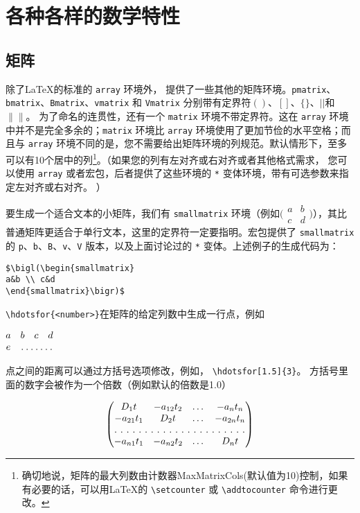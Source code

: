 \VerbatimFootnotes
\chapter{各种各样的数学特性}
\section{矩阵}
除了\LaTeX 的标准的 \verb|array| 环境外，  提供了一些其他的矩阵环境。\verb|pmatrix|、\verb|bmatrix|、\verb|Bmatrix|、\verb|vmatrix| 和 \verb|Vmatrix| 分别带有定界符$()$、$[]$、$\{\}$、$||$和$\|\|$。 为了命名的连贯性，还有一个 \verb|matrix| 环境不带定界符。这在 \verb|array| 环境中并不是完全多余的；\verb|matrix| 环境比 \verb|array| 环境使用了更加节俭的水平空格；而且与 \verb|array| 环境不同的是，您不需要给出矩阵环境的列规范。默认情形下，至多可以有10个居中的列\footnote{确切地说，矩阵的最大列数由计数器{\ttfamily MaxMatrixCols}(默认值为10)控制，如果有必要的话，可以用\LaTeX 的 \verb|\setcounter| 或 \verb|\addtocounter| 命令进行更改。}。（如果您的列有左对齐或右对齐或者其他格式需求，  您可以使用 \verb|array| 或者宏包，后者提供了这些环境的 \verb|*| 变体环境，带有可选参数来指定左对齐或右对齐。 ）

要生成一个适合文本的小矩阵，我们有 \verb|smallmatrix| 环境（例如$\bigl(\begin{smallmatrix}
a&b\\ c&d
\end{smallmatrix}\bigr)$），其比普通矩阵更适合于单行文本，这里的定界符一定要指明。宏包提供了 \verb|smallmatrix| 的 \verb|p|、\verb|b|、\verb|B|、\verb|v|、\verb|V| 版本，以及上面讨论过的 \verb|*| 变体。上述例子的生成代码为：
\begin{verbatim}
$\bigl(\begin{smallmatrix}
a&b \\ c&d
\end{smallmatrix}\bigr)$
\end{verbatim}

\verb|\hdotsfor{<number>}|在矩阵的给定列数中生成一行点，例如
\begin{listing}
$\begin{matrix}
    a&b&c&d\\
    e&\hdotsfor{3}
\end{matrix}$
\end{listing}

点之间的距离可以通过方括号选项修改，例如，  \verb|\hdotsfor[1.5]{3}|。 方括号里面的数字会被作为一个倍数（例如默认的倍数是1.0）
\begin{listing}
\begin{equation}
\begin{pmatrix}
D_1t&-a_{12}t_2&\dots&-a_{n}t_n\\
-a_{21}t_1&D_2t&\dots&-a_{2n}t_n\\
\hdotsfor[2]{4}\\
-a_{n1}t_1&-a_{n2}t_2&\dots&D_nt
\end{pmatrix}
\end{equation}
\end{listing}


